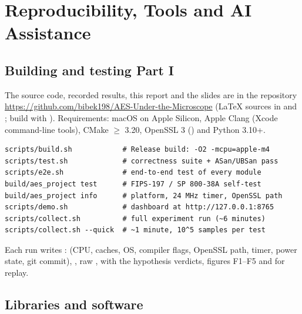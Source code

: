 \chapter{Reproducibility, Tools and AI Assistance}
\label{app:repro}

\section{Building and testing Part I}

The source code, recorded results, this report and the slides are in the repository \url{https://github.com/bibek198/AES-Under-the-Microscope} (\LaTeX{} sources in  and ; build with ). Requirements: macOS on Apple Silicon, Apple Clang (Xcode command-line tools), CMake $\ge$ 3.20, OpenSSL 3 () and Python 3.10+.

\begin{lstlisting}[caption={Build, test and demonstration commands.}]
scripts/build.sh            # Release build: -O2 -mcpu=apple-m4
scripts/test.sh             # correctness suite + ASan/UBSan pass
scripts/e2e.sh              # end-to-end test of every module
build/aes_project test      # FIPS-197 / SP 800-38A self-test
build/aes_project info      # platform, 24 MHz timer, OpenSSL path
scripts/demo.sh             # dashboard at http://127.0.0.1:8765
scripts/collect.sh          # full experiment run (~6 minutes)
scripts/collect.sh --quick  # ~1 minute, 10^5 samples per test
\end{lstlisting}

Each run writes :  (CPU, caches, OS, compiler flags, OpenSSL path, timer, power state, git commit), , raw ,  with the hypothesis verdicts, figures F1--F5 and  for replay.

\section{Libraries and software}

